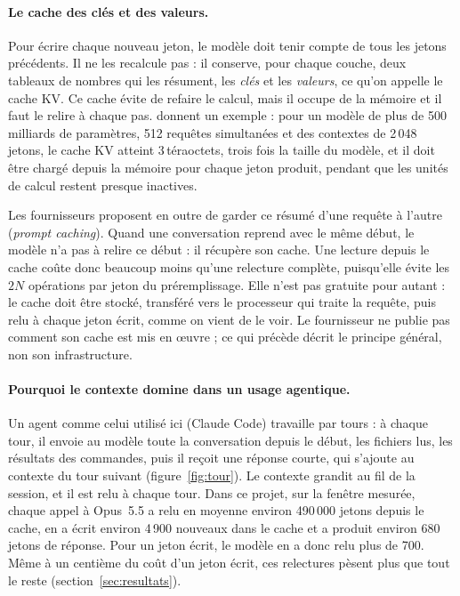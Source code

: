 \documentclass[11pt,a4paper]{article}
\begin{document}
\paragraph{Le cache des clés et des valeurs.} Pour écrire chaque nouveau jeton, le modèle doit tenir compte de tous les jetons précédents. Il ne les recalcule pas : il conserve, pour chaque couche, deux tableaux de nombres qui les résument, les \emph{clés} et les \emph{valeurs}, ce qu'on appelle le cache KV. Ce cache évite de refaire le calcul, mais il occupe de la mémoire et il faut le relire à chaque pas. \citet{pope2023} donnent un exemple : pour un modèle de plus de 500 milliards de paramètres, 512 requêtes simultanées et des contextes de 2\,048 jetons, le cache KV atteint 3\,téraoctets, trois fois la taille du modèle, et il doit être chargé depuis la mémoire pour chaque jeton produit, pendant que les unités de calcul restent presque inactives.

Les fournisseurs proposent en outre de garder ce résumé d'une requête à l'autre (\emph{prompt caching}). Quand une conversation reprend avec le même début, le modèle n'a pas à relire ce début : il récupère son cache. Une lecture depuis le cache coûte donc beaucoup moins qu'une relecture complète, puisqu'elle évite les $2N$ opérations par jeton du préremplissage. Elle n'est pas gratuite pour autant : le cache doit être stocké, transféré vers le processeur qui traite la requête, puis relu à chaque jeton écrit, comme on vient de le voir. Le fournisseur ne publie pas comment son cache est mis en œuvre ; ce qui précède décrit le principe général, non son infrastructure.

\paragraph{Pourquoi le contexte domine dans un usage agentique.} Un agent comme celui utilisé ici (Claude Code) travaille par tours : à chaque tour, il envoie au modèle toute la conversation depuis le début, les fichiers lus, les résultats des commandes, puis il reçoit une réponse courte, qui s'ajoute au contexte du tour suivant (figure~\ref{fig:tour}). Le contexte grandit au fil de la session, et il est relu à chaque tour. Dans ce projet, sur la fenêtre mesurée, chaque appel à Opus~5.5 a relu en moyenne environ 490\,000 jetons depuis le cache, en a écrit environ 4\,900 nouveaux dans le cache et a produit environ 680 jetons de réponse. Pour un jeton écrit, le modèle en a donc relu plus de 700. Même à un centième du coût d'un jeton écrit, ces relectures pèsent plus que tout le reste (section~\ref{sec:resultats}).
\end{document}
